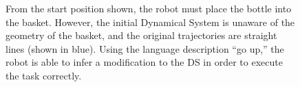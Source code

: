 \begin{figure}[t]
  \centering
  \caption{
    From the start position shown, the robot must place the bottle into the basket.
    However, the initial Dynamical System is unaware of the geometry of the basket, and the original trajectories are straight lines (shown in blue).
    Using the language description ``go up,'' the robot is able to infer a modification to the DS in order to execute the task correctly.
  }
  \label{figExperimentSetup}
\end{figure}
